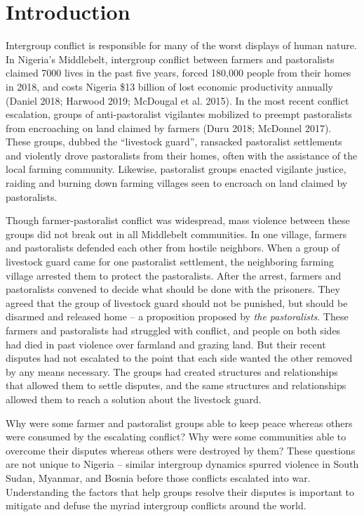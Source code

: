 \documentclass[11pt]{article}
\begin{document}
\hypertarget{introduction}{%
\section{Introduction}\label{introduction}}

Intergroup conflict is responsible for many of the worst displays of
human nature. In Nigeria's Middlebelt, intergroup conflict between
farmers and pastoralists claimed 7000 lives in the past five years,
forced 180,000 people from their homes in 2018, and costs Nigeria \$13
billion of lost economic productivity annually (Daniel 2018; Harwood
2019; McDougal et al. 2015). In the most recent conflict escalation,
groups of anti-pastoralist vigilantes mobilized to preempt pastoralists
from encroaching on land claimed by farmers (Duru 2018; McDonnel 2017).
These groups, dubbed the ``livestock guard'', ransacked pastoralist
settlements and violently drove pastoralists from their homes, often
with the assistance of the local farming community. Likewise,
pastoralist groups enacted vigilante justice, raiding and burning down
farming villages seen to encroach on land claimed by pastoralists.

Though farmer-pastoralist conflict was widespread, mass violence between
these groups did not break out in all Middlebelt communities. In one
village, farmers and pastoralists defended each other from hostile
neighbors. When a group of livestock guard came for one pastoralist
settlement, the neighboring farming village arrested them to protect the
pastoralists. After the arrest, farmers and pastoralists convened to
decide what should be done with the prisoners. They agreed that the
group of livestock guard should not be punished, but should be disarmed
and released home -- a proposition proposed by \emph{the pastoralists}.
These farmers and pastoralists had struggled with conflict, and people
on both sides had died in past violence over farmland and grazing land.
But their recent disputes had not escalated to the point that each side
wanted the other removed by any means necessary. The groups had created
structures and relationships that allowed them to settle disputes, and
the same structures and relationships allowed them to reach a solution
about the livestock guard.

Why were some farmer and pastoralist groups able to keep peace whereas
others were consumed by the escalating conflict? Why were some
communities able to overcome their disputes whereas others were
destroyed by them? These questions are not unique to Nigeria -- similar
intergroup dynamics spurred violence in South Sudan, Myanmar, and Bosnia
before those conflicts escalated into war. Understanding the factors
that help groups resolve their disputes is important to mitigate and
defuse the myriad intergroup conflicts around the world.
\end{document}

